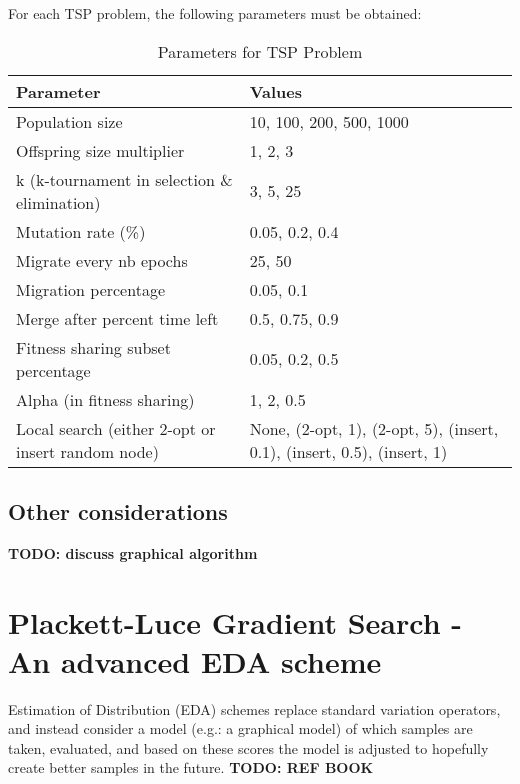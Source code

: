 \documentclass[a4paper,10pt]{article}
\newcommand{\ReplaceMe}[1]{{\color{blue}#1}}
\begin{document}
	For each TSP problem, the following parameters must be obtained:
	\begin{table}[ht]
		\centering
		\begin{tabularx}{0.9\textwidth}{|X|X|}
			\hline
			\textbf{Parameter} & \textbf{Values} \\
			\hline
			Population size & 10, 100, 200, 500, 1000 \\
			\hline
			Offspring size multiplier & 1, 2, 3 \\
			\hline
			k (k-tournament in selection \& elimination) & 3, 5, 25 \\
			\hline
			Mutation rate (\%) & 0.05, 0.2, 0.4 \\
			\hline
			Migrate every nb epochs & 25, 50 \\
			\hline
			Migration percentage & 0.05, 0.1 \\
			\hline
			Merge after percent time left & 0.5, 0.75, 0.9 \\
			\hline
			Fitness sharing subset percentage & 0.05, 0.2, 0.5 \\
			\hline
			Alpha (in fitness sharing) & 1, 2, 0.5 \\
			\hline
			Local search (either 2-opt or insert random node) & None, (2-opt, 1), (2-opt, 5), (insert, 0.1), (insert, 0.5), (insert, 1) \\
			\hline
		\end{tabularx}
		\caption{Parameters for TSP Problem}
	\end{table}

	

\subsection{Other considerations}\label{sec_oth}
\textbf{TODO: discuss graphical algorithm}





\section{Plackett-Luce Gradient Search - An advanced EDA scheme} \label{cha:pl-gs}
	Estimation of Distribution (EDA) schemes replace standard variation operators, and instead consider a model (e.g.: a graphical model) of which samples are taken, evaluated, and based on these scores the model is adjusted to hopefully create better samples in the future. \textbf{TODO: REF BOOK}
	
\end{document}
